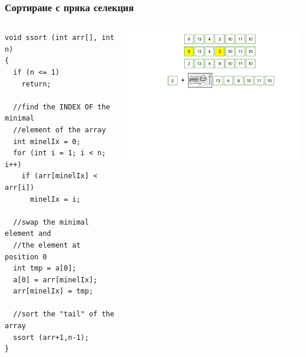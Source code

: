 \documentclass{beamer}
\begin{document}
\begin{frame}[fragile]
\frametitle{Сортиране с пряка селекция}



\begin{columns}[t]
  \begin{column}{0.5\textwidth}

\begin{lstlisting}
void ssort (int arr[], int n)
{
  if (n <= 1)
    return;

  //find the INDEX OF the minimal 
  //element of the array
  int minelIx = 0;
  for (int i = 1; i < n; i++)
    if (arr[minelIx] < arr[i])
      minelIx = i;

  //swap the minimal element and
  //the element at position 0
  int tmp = a[0];
  a[0] = arr[minelIx];
  arr[minelIx] = tmp;

  //sort the "tail" of the array  
  ssort (arr+1,n-1);
}
\end{lstlisting}


  \end{column}
  \begin{column}{0.5\textwidth}
\vspace*{-1pt}
\hspace*{-70pt}
\includegraphics[width=10cm]{images/ssort_rec} 

  \end{column}
\end{columns}

\end{frame}
\end{document}
